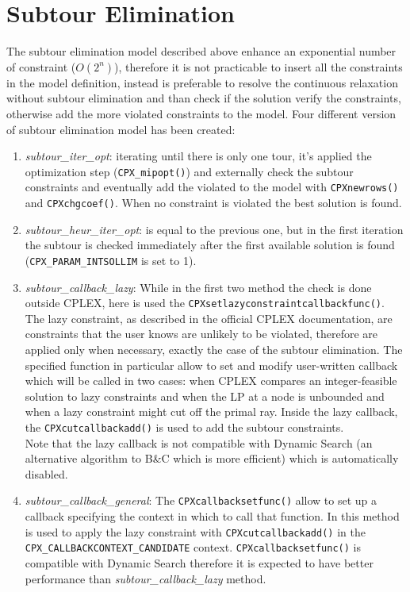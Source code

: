 \section{Subtour Elimination}\label{sec:subtour}
The subtour elimination model described above enhance an exponential number of constraint ($ O(2^n) $), therefore it is not practicable to insert all the constraints in the model definition, instead is preferable to resolve the continuous relaxation without subtour elimination and than check if the solution verify the constraints, otherwise add the more violated constraints to the model. Four different version of subtour elimination model has been created:
\begin{enumerate}
	\item \textit{subtour\_iter\_opt}: iterating until there is only one tour, it's applied the optimization step (\texttt{CPX\_mipopt()}) and externally check the subtour constraints and eventually add the violated to the model with \texttt{CPXnewrows()} and \texttt{CPXchgcoef()}. When no constraint is violated the best solution is found.
	\item \textit{subtour\_heur\_iter\_opt}: is equal to the previous one, but in the first iteration the subtour is checked immediately after the first available solution is found (\texttt{CPX\_PARAM\_INTSOLLIM} is set to 1). 
	\item \textit{subtour\_callback\_lazy}: While in the first two method the check is done outside CPLEX, here is used the \texttt{CPXsetlazyconstraintcallbackfunc()}. The lazy constraint, as described in the official CPLEX documentation, are constraints that the user knows are unlikely to be violated, therefore are applied only when necessary, exactly the case of the subtour elimination. The specified function in particular allow to set and modify user-written callback which will be called in two cases: when CPLEX compares an integer-feasible solution to lazy constraints and when the LP at a node is unbounded and when a lazy constraint might cut off the primal ray. Inside the lazy callback, the \texttt{CPXcutcallbackadd()} is used to add the subtour constraints. \\ Note that the lazy callback is not compatible with Dynamic Search (an alternative algorithm to B\&C which is more efficient) which is automatically disabled.
	\item \textit{subtour\_callback\_general}: The \texttt{CPXcallbacksetfunc()} allow to set up a callback specifying the context in which to call that function. In this method is used to apply the lazy constraint with \texttt{CPXcutcallbackadd()} in the \texttt{CPX\_CALLBACKCONTEXT\_CANDIDATE} context. \texttt{CPXcallbacksetfunc()} is compatible with Dynamic Search therefore it is expected to have better performance than \textit{subtour\_callback\_lazy} method.
\end{enumerate} 

